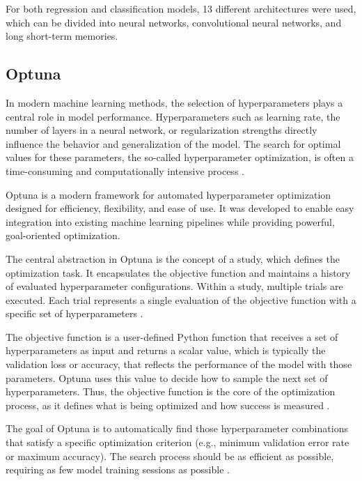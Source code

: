 For both regression and classification models, 13 different architectures were used, which can be divided into neural networks, convolutional neural networks, and long short-term memories.


\subsection{Optuna}

In modern machine learning methods, the selection of hyperparameters plays a central role in model performance.
Hyperparameters such as learning rate, the number of layers in a neural network, or regularization strengths directly influence the behavior and generalization of the model.
The search for optimal values for these parameters, the so-called hyperparameter optimization, is often a time-consuming and computationally intensive process \cite{hyperparameter-importance}.

Optuna is a modern framework for automated hyperparameter optimization designed for efficiency, flexibility, and ease of use.
It was developed to enable easy integration into existing machine learning pipelines while providing powerful, goal-oriented optimization.

The central abstraction in Optuna is the concept of a study, which defines the optimization task.
It encapsulates the objective function and maintains a history of evaluated hyperparameter configurations.
Within a study, multiple trials are executed.
Each trial represents a single evaluation of the objective function with a specific set of hyperparameters \cite{optuna-basics}.

The objective function is a user-defined Python function that receives a set of hyperparameters as input and returns a scalar value, which is typically the validation loss or accuracy, that reflects the performance of the model with those parameters.
Optuna uses this value to decide how to sample the next set of hyperparameters.
Thus, the objective function is the core of the optimization process, as it defines what is being optimized and how success is measured \cite{optuna-basics}.

The goal of Optuna is to automatically find those hyperparameter combinations that satisfy a specific optimization criterion (e.g., minimum validation error rate or maximum accuracy).
The search process should be as efficient as possible, requiring as few model training sessions as possible \cite{optuna-hyperparameters}.

